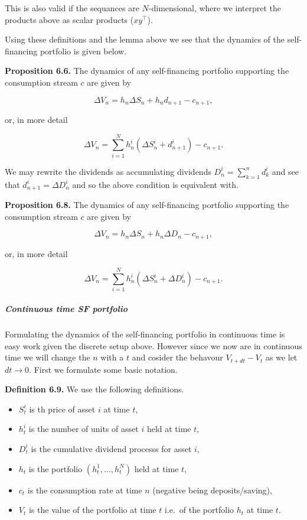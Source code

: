 \documentclass[
]{article}
\providecommand{\tightlist}{%
  \setlength{\itemsep}{0pt}\setlength{\parskip}{0pt}}
\begin{document}
This is also valid if the sequances are \(N\)-dimensional, where we
interpret the products above as scalar products (\(xy^\top\)).

Using these definitions and the lemma above we see that the dynamics of
the self-financing portfolio is given below.

\textbf{Proposition 6.6.} The dynamics of any self-financing portfolio
supporting the consumption stream \(c\) are given by

\[
\Delta V_n=h_n \Delta S_n+h_nd_{n+1}-c_{n+1},
\]

or, in more detail

\[
\Delta V_n=\sum_{i=1}^Nh_n^i(\Delta S_n^i+d^i_{n+1})-c_{n+1}.
\]

We may rewrite the dividends as accumulating dividends
\(D^i_n=\sum_{k=1}^nd^i_k\) and see that \(d_{n+1}^i=\Delta D^i_n\) and
so the above condition is equivalent with.

\textbf{Proposition 6.8.} The dynamics of any self-financing portfolio
supporting the consumption stream \(c\) are given by

\[
\Delta V_n=h_n \Delta S_n+h_n\Delta D_n-c_{n+1},
\]

or, in more detail

\[
\Delta V_n=\sum_{i=1}^Nh_n^i(\Delta S_n^i+\Delta D^i_n)-c_{n+1}.
\]

\hypertarget{continuous-time-sf-portfolio}{%
\subparagraph{Continuous time SF
portfolio}\label{continuous-time-sf-portfolio}}

Formulating the dynamics of the self-financing portfolio in continuous
time is easy work given the discrete setup above. However since we now
are in continuous time we will change the \(n\) with a \(t\) and cosider
the behavour \(V_{t+dt}-V_t\) as we let \(dt\to 0\). First we formulate
some basic notation.

\textbf{Definition 6.9.} We use the following definitions.

\begin{itemize}
\tightlist
\item
  \(S_t^i\) is th price of asset \(i\) at time \(t\),
\item
  \(h_t^i\) is the number of units of asset \(i\) held at time \(t\),
\item
  \(D_t^i\) is the cumulative dividend processs for asset \(i\),
\item
  \(h_t\) is the portfolio \((h_t^1,...,h_t^N)\) held at time \(t\),
\item
  \(c_t\) is the consumption rate at time \(n\) (negative being
  deposits/saving),
\item
  \(V_t\) is the value of the portfolio at time \(t\) i.e.~of the
  portfolio \(h_t\) at time \(t\).
\end{itemize}
\end{document}

